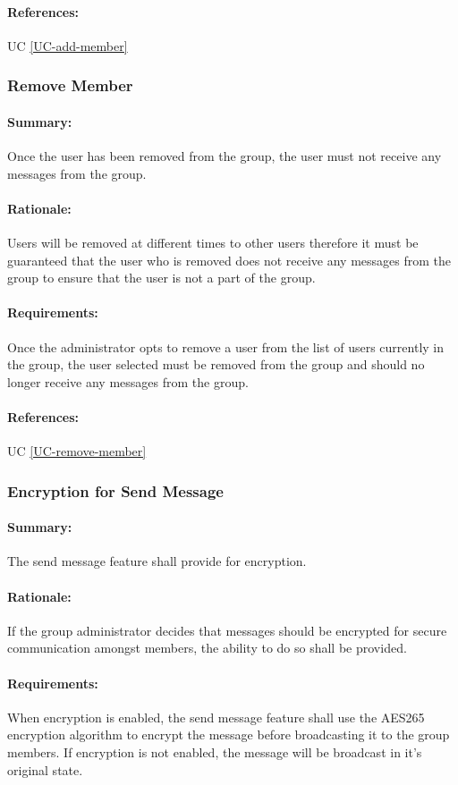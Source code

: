 \documentclass[11pt]{article}
\begin{document}
\paragraph{References:} UC \ref{UC-add-member}

\subsubsection{Remove Member} \label{FR-remove-member}
\paragraph{Summary:}
Once the user has been removed from the group, the user must not receive any messages from the group.
\paragraph{Rationale:}
Users will be removed at different times to other users therefore it must be guaranteed that the user who is removed does not receive any messages from the group to ensure that the user is not a part of the group.
\paragraph{Requirements:}
Once the administrator opts to remove a user from the list of users currently in the group, the user selected must be removed from the group and should no longer receive any messages from the group.
\paragraph{References:} UC \ref{UC-remove-member}

\subsubsection{Encryption for Send Message} \label{FR-send-message-encrypted}
\paragraph{Summary:} The send message feature shall provide for encryption.
\paragraph{Rationale:} If the group administrator decides that messages should be encrypted for secure communication amongst members, the ability to do so shall be provided.
\paragraph{Requirements:} When encryption is enabled, the send message feature shall use the AES265 encryption algorithm to encrypt the message before broadcasting it to the group members. If encryption is not enabled, the message will be broadcast in it's original state.
\end{document}
